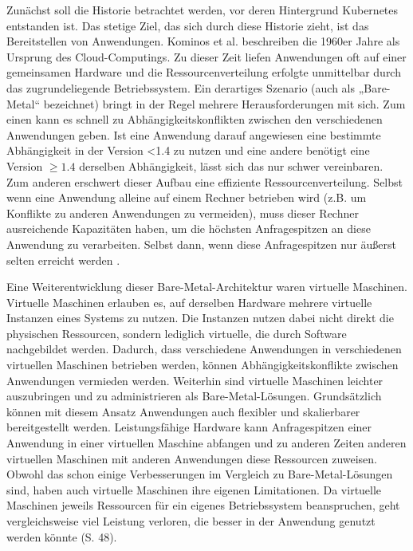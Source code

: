 \documentclass[11pt,a4paper]{article}
\begin{document}
Zunächst soll die Historie betrachtet werden, vor deren Hintergrund Kubernetes entstanden ist.
Das stetige Ziel, das sich durch diese Historie zieht, ist das Bereitstellen von Anwendungen.
Kominos et al. \cite{7899247} beschreiben die 1960er Jahre als Ursprung des Cloud-Computings.
Zu dieser Zeit liefen Anwendungen oft auf einer gemeinsamen Hardware und die Ressourcenverteilung erfolgte unmittelbar durch das zugrundeliegende Betriebssystem.
Ein derartiges Szenario (auch als „Bare-Metal“ bezeichnet) bringt in der Regel mehrere Herausforderungen mit sich.
Zum einen kann es schnell zu Abhängigkeitskonflikten zwischen den verschiedenen Anwendungen geben.
Ist eine Anwendung darauf angewiesen eine bestimmte Abhängigkeit in der Version <1.4 zu nutzen und eine andere
benötigt eine Version \(\geq 1.4\) derselben Abhängigkeit, lässt sich das nur schwer vereinbaren.
Zum anderen erschwert dieser Aufbau eine effiziente Ressourcenverteilung. Selbst wenn eine Anwendung alleine auf einem Rechner betrieben wird (z.B. um Konflikte zu anderen
Anwendungen zu vermeiden), muss dieser Rechner ausreichende Kapazitäten haben, um die höchsten Anfragespitzen an diese Anwendung zu verarbeiten.
Selbst dann, wenn diese Anfragespitzen nur äußerst selten erreicht werden \cite{Pagani_2019}.

Eine Weiterentwicklung dieser Bare-Metal-Architektur waren virtuelle Maschinen.
Virtuelle Maschinen erlauben es, auf derselben Hardware mehrere virtuelle Instanzen eines
Systems zu nutzen. Die Instanzen nutzen dabei nicht direkt die physischen Ressourcen, sondern lediglich virtuelle,
die durch Software nachgebildet werden.
Dadurch, dass verschiedene Anwendungen in verschiedenen virtuellen Maschinen betrieben werden, können Abhängigkeitskonflikte zwischen Anwendungen
vermieden werden. Weiterhin sind virtuelle Maschinen leichter auszubringen und zu administrieren als Bare-Metal-Lösungen.
Grundsätzlich können mit diesem Ansatz Anwendungen auch flexibler und skalierbarer bereitgestellt werden.
Leistungsfähige Hardware kann Anfragespitzen einer Anwendung in einer virtuellen Maschine abfangen und
zu anderen Zeiten anderen virtuellen Maschinen mit anderen
Anwendungen diese Ressourcen zuweisen.
Obwohl das schon einige Verbesserungen im Vergleich zu Bare-Metal-Lösungen sind, haben auch virtuelle Maschinen ihre eigenen Limitationen.
Da virtuelle Maschinen jeweils Ressourcen für ein eigenes Betriebssystem beanspruchen, geht vergleichsweise viel Leistung verloren,
die besser in der Anwendung genutzt werden könnte \cite{kofler2021docker} (S. 48).
\end{document}
